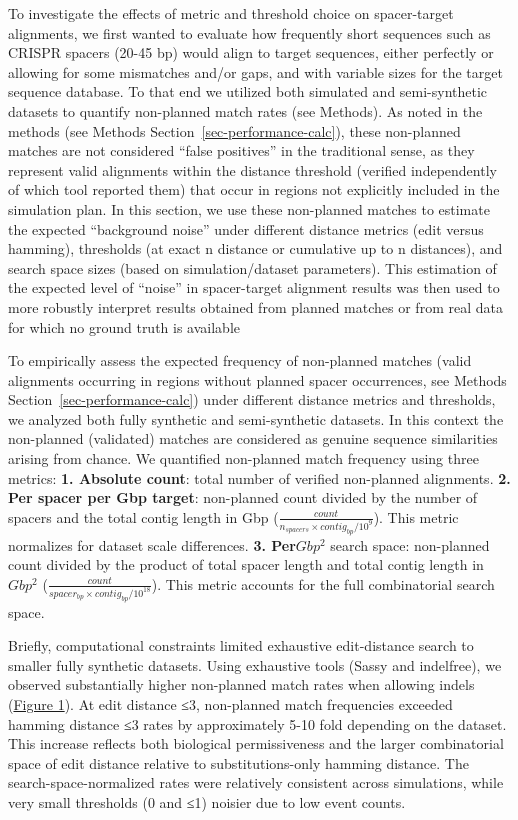 \documentclass[
]{article}
\begin{document}
To investigate the effects of metric and threshold choice on
spacer-target alignments, we first wanted to evaluate how frequently
short sequences such as CRISPR spacers (20-45 bp) would align to target
sequences, either perfectly or allowing for some mismatches and/or gaps,
and with variable sizes for the target sequence database. To that end we
utilized both simulated and semi-synthetic datasets to quantify
non-planned match rates (see Methods). As noted in the methods (see
Methods Section~\ref{sec-performance-calc}), these non-planned matches
are not considered ``false positives'' in the traditional sense, as they
represent valid alignments within the distance threshold (verified
independently of which tool reported them) that occur in regions not
explicitly included in the simulation plan. In this section, we use
these non-planned matches to estimate the expected ``background noise''
under different distance metrics (edit versus hamming), thresholds (at
exact n distance or cumulative up to n distances), and search space
sizes (based on simulation/dataset parameters). This estimation of the
expected level of ``noise'' in spacer-target alignment results was then
used to more robustly interpret results obtained from planned matches or
from real data for which no ground truth is available

To empirically assess the expected frequency of non-planned matches
(valid alignments occurring in regions without planned spacer
occurrences, see Methods Section~\ref{sec-performance-calc}) under
different distance metrics and thresholds, we analyzed both fully
synthetic and semi-synthetic datasets. In this context the non-planned
(validated) matches are considered as genuine sequence similarities
arising from chance. We quantified non-planned match frequency using
three metrics: \textbf{1. Absolute count}: total number of verified
non-planned alignments. \textbf{2.} \textbf{Per spacer per Gbp target}:
non-planned count divided by the number of spacers and the total contig
length in Gbp (\(\frac{count}{n_{spacers}\times{contig_{bp}/10^{9}}}\)).
This metric normalizes for dataset scale differences. \textbf{3.
Per}\(Gbp^{2}\) search space: non-planned count divided by the product
of total spacer length and total contig length in \(Gbp^{2}\)
(\(\frac{count}{spacer_{bp}\times{contig_{bp}/10^{18}}}\)). This metric
accounts for the full combinatorial search space.

Briefly, computational constraints limited exhaustive edit-distance
search to smaller fully synthetic datasets. Using exhaustive tools
(Sassy and indelfree), we observed substantially higher non-planned
match rates when allowing indels
(\hyperref[fig-background-normalization]{Figure 1}). At edit distance
≤3, non-planned match frequencies exceeded hamming distance ≤3 rates by
approximately 5-10 fold depending on the dataset. This increase reflects
both biological permissiveness and the larger combinatorial space of
edit distance relative to substitutions-only hamming distance. The
search-space-normalized rates were relatively consistent across
simulations, while very small thresholds (0 and ≤1) noisier due to low
event counts.
\end{document}
